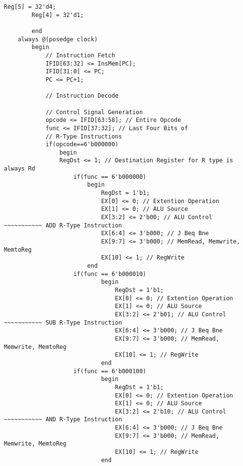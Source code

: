 \documentclass{article}
\begin{document}
\begin{lstlisting}[caption={ .}, label={lst:exemplo}, firstnumber=1, frame=single]
        Reg[5] = 32'd4;
        Reg[4] = 32'd1;
        
        end
    always @(posedge clock)
        begin
            // Instruction Fetch
            IFID[63:32] <= InsMem[PC];
            IFID[31:0] <= PC;
            PC <= PC+1;
            
            // Instruction Decode

            // Control Signal Generation
            opcode <= IFID[63:58]; // Entire Opcode
            func <= IFID[37:32]; // Last Four Bits of 
            // R-Type Instructions
            if(opcode==6'b000000)
                begin
                RegDst <= 1; // Destination Register for R type is always Rd
                    if(func == 6'b000000)
                        begin
                            RegDst = 1'b1;
                            EX[0] <= 0; // Extention Operation
                            EX[1] <= 0; // ALU Source
                            EX[3:2] <= 2'b00; // ALU Control ~~~~~~~~~~~ ADD R-Type Instruction
                            EX[6:4] <= 3'b000; // J Beq Bne
                            EX[9:7] <= 3'b000; // MemRead, Memwrite, MemtoReg
                            EX[10] <= 1; // RegWrite                                                       
                        end
                    if(func == 6'b000010)
                            begin
                                RegDst = 1'b1;
                                EX[0] <= 0; // Extention Operation
                                EX[1] <= 0; // ALU Source
                                EX[3:2] <= 2'b01; // ALU Control ~~~~~~~~~~~ SUB R-Type Instruction
                                EX[6:4] <= 3'b000; // J Beq Bne
                                EX[9:7] <= 3'b000; // MemRead, Memwrite, MemtoReg
                                EX[10] <= 1; // RegWrite                                                       
                            end
                    if(func == 6'b000100)
                            begin
                                RegDst = 1'b1;
                                EX[0] <= 0; // Extention Operation
                                EX[1] <= 0; // ALU Source
                                EX[3:2] <= 2'b10; // ALU Control ~~~~~~~~~~~ AND R-Type Instruction
                                EX[6:4] <= 3'b000; // J Beq Bne
                                EX[9:7] <= 3'b000; // MemRead, Memwrite, MemtoReg
                                EX[10] <= 1; // RegWrite                                                       
                            end


\end{lstlisting}
\end{document}
